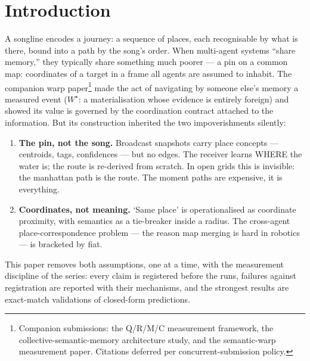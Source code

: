 \documentclass{article}
\newcommand{\wstar}{W^{\star}}
\begin{document}
\section{Introduction}
\label{sec:intro}

A songline encodes a journey: a sequence of places, each recognisable
by what is there, bound into a path by the song's order. When
multi-agent systems ``share memory,'' they typically share something
much poorer --- a pin on a common map: coordinates of a target in a
frame all agents are assumed to inhabit. The companion warp
paper\footnote{Companion submissions: the Q/R/M/C measurement
framework, the collective-semantic-memory architecture study, and the
semantic-warp measurement paper. Citations deferred per
concurrent-submission policy.} made the act of navigating by someone
else's memory a measured event ($\wstar$: a materialisation whose
evidence is entirely foreign) and showed its value is governed by the
coordination contract attached to the information. But its
construction inherited the two impoverishments silently:

\begin{enumerate}[leftmargin=20pt,itemsep=2pt,topsep=2pt]
\item \textbf{The pin, not the song.} Broadcast snapshots carry place
  concepts --- centroids, tags, confidences --- but no edges. The
  receiver learns WHERE the water is; the route is re-derived from
  scratch. In open grids this is invisible: the manhattan path is the
  route. The moment paths are expensive, it is everything.
\item \textbf{Coordinates, not meaning.} `Same place' is operationalised
  as coordinate proximity, with semantics as a tie-breaker inside a
  radius. The cross-agent place-correspondence problem --- the reason
  map merging is hard in robotics --- is bracketed by fiat.
\end{enumerate}

This paper removes both assumptions, one at a time, with the
measurement discipline of the series: every claim is registered before
the runs, failures against registration are reported with their
mechanisms, and the strongest results are exact-match validations of
closed-form predictions.
\end{document}

